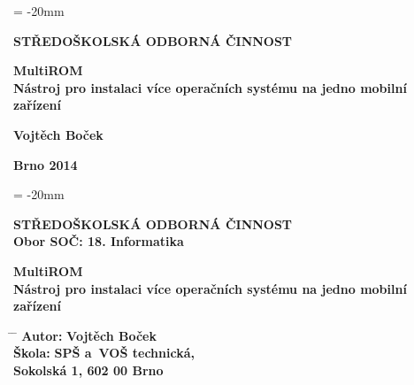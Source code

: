 \documentclass[12pt, a4paper, oneside]{article}
\newcommand{\B}{\textbf} %
\begin{document}

\pagestyle{empty} %
 
\voffset = -20mm %
\enlargethispage{60mm} %

\begin{center}
 
\Large \B{STŘEDOŠKOLSKÁ ODBORNÁ ČINNOST}

\vspace{60mm}

\Huge %
\B{MultiROM} \\
\LARGE
\B{Nástroj pro instalaci více operačních systému na jedno mobilní zařízení}

\Large

\vspace{90mm}


\B{Vojtěch Boček} \\

\vspace{40mm}

\B{Brno 2014}


\end{center}

\newpage %

\voffset = -20mm %
\enlargethispage{60mm} %

\begin{center}

\Large \B{STŘEDOŠKOLSKÁ ODBORNÁ ČINNOST}  \\
\vspace{10mm}
 \normalsize 
\B{Obor SOČ: 18. Informatika}%

\vspace{45mm}

\Huge
\B{MultiROM} \\
\LARGE
\B{Nástroj pro instalaci více operačních systému na jedno mobilní zařízení}
\end{center}
\large

\vspace{50mm}


\begin{tabbing}
\hspace{10mm} \= \hspace{30mm}  \=   \kill %
  \> \B{Autor:}  \> \B{Vojtěch Boček}        \\[8mm] 
  \> \B{Škola:}   \> \B{SPŠ a~VOŠ technická, }     \\
  \>              \> \B{Sokolská 1, 602 00 Brno}    \\[8mm]
\end{tabbing}
\end{document}
